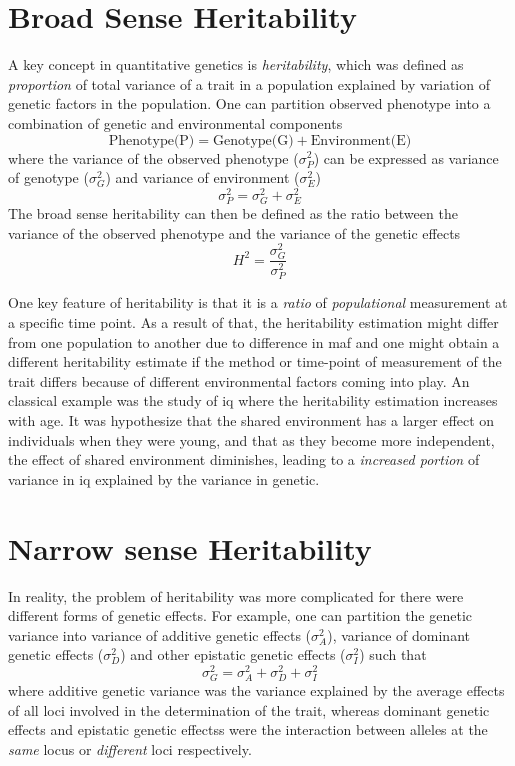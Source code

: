 \documentclass[12pt]{book}
\begin{document}
	\section{Broad Sense Heritability}

	A key concept in quantitative genetics is \emph{heritability}, which was defined as \emph{proportion} of total variance of a trait in a population explained by variation of genetic factors in the population.
	One can partition observed phenotype into a combination of genetic and environmental components\citep{Falconer1996}
	$$
	\text{Phenotype(P)}=\text{Genotype(G)}+\text{Environment(E)}
	$$
	where the variance of the observed phenotype ($\sigma_P^2$) can be expressed as variance of genotype ($\sigma_G^2$) and variance of environment ($\sigma_E^2$)
	$$
		\sigma_P^2=\sigma_G^2+\sigma_E^2
	$$
	The broad sense heritability can then be defined as the ratio between the variance of the observed phenotype and the variance of the genetic effects
	$$
	H^2=\frac{\sigma_G^2}{\sigma_P^2}
	$$
	
	One key feature of heritability is that it is a \emph{ratio} of \emph{populational} measurement at a specific time point.
	As a result of that, the heritability estimation might differ from one population to another due to difference in \gls{maf} and one might obtain a different heritability estimate if the method or time-point of measurement of the trait differs because of different environmental factors coming into play.
	An classical example was the study of \gls{iq} where the heritability estimation increases with age\citep{Bouchard2013}.
	It was hypothesize that the shared environment has a larger effect on individuals when they were young, and that as they become more independent, the effect of shared environment diminishes, leading to a \emph{increased portion} of variance in \gls{iq} explained by the variance in genetic\citep{Bouchard2013}. 
	
	\section{Narrow sense Heritability}
	In reality, the problem of heritability was more complicated for there were different forms of genetic effects. 
	For example, one can partition the genetic variance into variance of additive genetic effects ($\sigma_A^2$), variance of dominant genetic effects ($\sigma_D^2$) and other epistatic genetic effects ($\sigma_I^2$) such that
	$$
		\sigma_G^2=\sigma_A^2+\sigma_D^2+\sigma_I^2
	$$
	where additive genetic variance was the variance explained by the average effects of all loci involved in the determination of the trait, whereas dominant genetic effects and epistatic genetic effectss were the interaction between alleles at the \emph{same} locus or \emph{different} loci respectively.
	
\end{document}
